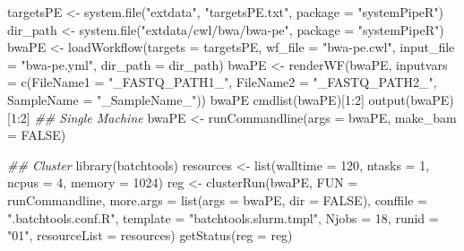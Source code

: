 \documentclass[14pt,]{article}
\newcommand{\hlnum}[1]{\textcolor[rgb]{0.816,0.125,0.439}{#1}}%
\newcommand{\hlstr}[1]{\textcolor[rgb]{0.251,0.627,0.251}{#1}}%
\newcommand{\hlcom}[1]{\textcolor[rgb]{0.502,0.502,0.502}{\textit{#1}}}%
\newcommand{\hlopt}[1]{\textcolor[rgb]{0,0,0}{#1}}%
\newcommand{\hlstd}[1]{\textcolor[rgb]{0.251,0.251,0.251}{#1}}%
\newcommand{\hlkwc}[1]{\textcolor[rgb]{0.251,0.251,0.251}{#1}}%
\newcommand{\hlkwd}[1]{\textcolor[rgb]{0.878,0.439,0.125}{#1}}%
\newenvironment{Shaded}{\begin{myshaded}}{\end{myshaded}}
\newcommand{\KeywordTok}[1]{\hlkwd{#1}}
\newcommand{\DataTypeTok}[1]{\hlkwc{#1}}
\newcommand{\DecValTok}[1]{\hlnum{#1}}
\newcommand{\StringTok}[1]{\hlstr{#1}}
\newcommand{\CommentTok}[1]{\hlcom{#1}}
\newcommand{\OtherTok}[1]{{#1}}
\newcommand{\OperatorTok}[1]{\hlopt{#1}}
\newcommand{\NormalTok}[1]{\hlstd{#1}}
\begin{document}
\begin{Shaded}
\begin{Highlighting}[]
\NormalTok{targetsPE <-}\StringTok{ }\KeywordTok{system.file}\NormalTok{(}\StringTok{"extdata"}\NormalTok{, }\StringTok{"targetsPE.txt"}\NormalTok{, }\DataTypeTok{package =} \StringTok{"systemPipeR"}\NormalTok{)}
\NormalTok{dir_path <-}\StringTok{ }\KeywordTok{system.file}\NormalTok{(}\StringTok{"extdata/cwl/bwa/bwa-pe"}\NormalTok{, }\DataTypeTok{package =} \StringTok{"systemPipeR"}\NormalTok{)}
\NormalTok{bwaPE <-}\StringTok{ }\KeywordTok{loadWorkflow}\NormalTok{(}\DataTypeTok{targets =}\NormalTok{ targetsPE, }\DataTypeTok{wf_file =} \StringTok{"bwa-pe.cwl"}\NormalTok{, }\DataTypeTok{input_file =} \StringTok{"bwa-pe.yml"}\NormalTok{, }
    \DataTypeTok{dir_path =}\NormalTok{ dir_path)}
\NormalTok{bwaPE <-}\StringTok{ }\KeywordTok{renderWF}\NormalTok{(bwaPE, }\DataTypeTok{inputvars =} \KeywordTok{c}\NormalTok{(}\DataTypeTok{FileName1 =} \StringTok{"_FASTQ_PATH1_"}\NormalTok{, }\DataTypeTok{FileName2 =} \StringTok{"_FASTQ_PATH2_"}\NormalTok{, }
    \DataTypeTok{SampleName =} \StringTok{"_SampleName_"}\NormalTok{))}
\NormalTok{bwaPE}
\KeywordTok{cmdlist}\NormalTok{(bwaPE)[}\DecValTok{1}\OperatorTok{:}\DecValTok{2}\NormalTok{]}
\KeywordTok{output}\NormalTok{(bwaPE)[}\DecValTok{1}\OperatorTok{:}\DecValTok{2}\NormalTok{]}
\CommentTok{## Single Machine}
\NormalTok{bwaPE <-}\StringTok{ }\KeywordTok{runCommandline}\NormalTok{(}\DataTypeTok{args =}\NormalTok{ bwaPE, }\DataTypeTok{make_bam =} \OtherTok{FALSE}\NormalTok{)}

\CommentTok{## Cluster}
\KeywordTok{library}\NormalTok{(batchtools)}
\NormalTok{resources <-}\StringTok{ }\KeywordTok{list}\NormalTok{(}\DataTypeTok{walltime =} \DecValTok{120}\NormalTok{, }\DataTypeTok{ntasks =} \DecValTok{1}\NormalTok{, }\DataTypeTok{ncpus =} \DecValTok{4}\NormalTok{, }\DataTypeTok{memory =} \DecValTok{1024}\NormalTok{)}
\NormalTok{reg <-}\StringTok{ }\KeywordTok{clusterRun}\NormalTok{(bwaPE, }\DataTypeTok{FUN =}\NormalTok{ runCommandline, }\DataTypeTok{more.args =} \KeywordTok{list}\NormalTok{(}\DataTypeTok{args =}\NormalTok{ bwaPE, }\DataTypeTok{dir =} \OtherTok{FALSE}\NormalTok{), }
    \DataTypeTok{conffile =} \StringTok{".batchtools.conf.R"}\NormalTok{, }\DataTypeTok{template =} \StringTok{"batchtools.slurm.tmpl"}\NormalTok{, }\DataTypeTok{Njobs =} \DecValTok{18}\NormalTok{, }
    \DataTypeTok{runid =} \StringTok{"01"}\NormalTok{, }\DataTypeTok{resourceList =}\NormalTok{ resources)}
\KeywordTok{getStatus}\NormalTok{(}\DataTypeTok{reg =}\NormalTok{ reg)}
\end{Highlighting}
\end{Shaded}
\end{document}
